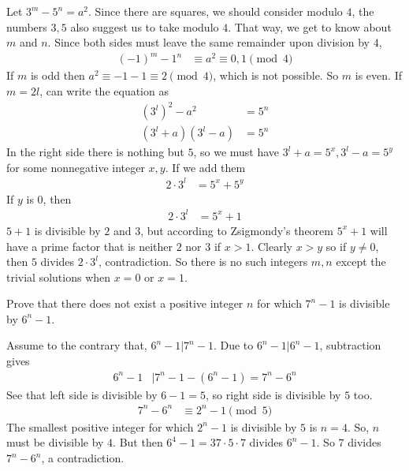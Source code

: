 \documentclass[problems.tex]{subfile}
\begin{document}
	\begin{solution}
		Let $3^m-5^n=a^2$. Since there are squares, we should consider modulo $4$, the numbers $3,5$ also suggest us to take modulo $4$. That way, we get to know about $m$ and $n$. Since both sides must leave the same remainder upon division by $4$,
		\begin{align*}
			(-1)^m-1^n &\equiv a^2\equiv0,1\pmod4
		\end{align*}
		If $m$ is odd then $a^2\equiv-1-1\equiv2\pmod4$, which is not possible. So $m$ is even.  If $m=2l$, can write the equation as
		\begin{align*}
			\left(3^l\right)^2-a^2 & = 5^n\\
			(3^l+a)(3^l-a) & = 5^n
		\end{align*}
		In the right side there is nothing but $5$, so we must have $3^l+a=5^x,3^l-a=5^y$ for some nonnegative integer $x,y$. If we add them
			\begin{align*}
				2\cdot3^l & = 5^x+5^y
			\end{align*}
		If $y$ is $0$, then
			\begin{align*}
				2\cdot3^l & = 5^x+1
			\end{align*}
		$5+1$ is divisible by $2$ and $3$, but according to Zsigmondy's theorem $5^x+1$ will have a prime factor that is neither $2$ nor $3$ if $x>1$. Clearly $x>y$ so if $y\neq0$, then $5$ divides $2\cdot3^l$, contradiction. So there is no such integers $m,n$ except the trivial solutions when $x=0$ or $x=1$.
	\end{solution}
	
	\begin{problem}[Croatia $2015$]
		Prove that there does not exist a positive integer $n$ for which $7^n-1$ is divisible by $6^n-1$.
	\end{problem}
	
	\begin{solution}
		Assume to the contrary that, $6^n-1|7^n-1$. Due to $6^n-1|6^n-1$, subtraction gives 
			\begin{align*}
				6^n-1 & |7^n-1-(6^n-1) = 7^n-6^n
			\end{align*}
		See that left side is divisible by $6-1=5$, so right side is divisible by $5$ too.
			\begin{align*}
				7^n-6^n &\equiv2^n-1\pmod5
			\end{align*}
		The smallest positive integer for which $2^n-1$ is divisible by $5$ is $n=4$. So, $n$ must be divisible by $4$. But then $6^4-1=37\cdot5\cdot7$ divides $6^n-1$. So $7$ divides $7^n-6^n$, a contradiction.
	\end{solution}
	
\end{document}
